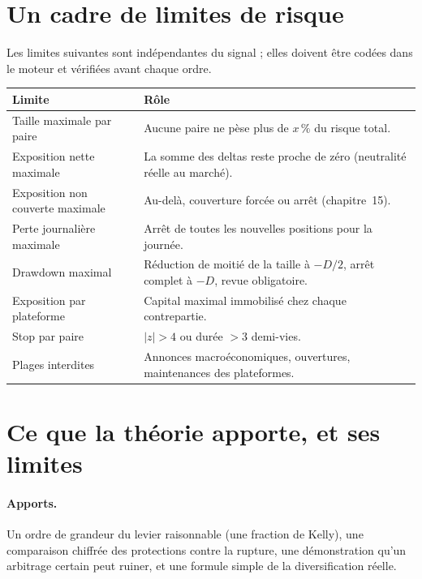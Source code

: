 \section{Un cadre de limites de risque}

Les limites suivantes sont indépendantes du signal ; elles doivent être codées dans le moteur et vérifiées avant chaque ordre.

\begin{center}\small
\begin{tabularx}{\textwidth}{>{\raggedright}p{4.2cm}>{\raggedright\arraybackslash}X}
\toprule
Limite & Rôle \\
\midrule
Taille maximale par paire & Aucune paire ne pèse plus de $x\,\%$ du risque total. \\
Exposition nette maximale & La somme des deltas reste proche de zéro (neutralité réelle au marché). \\
Exposition non couverte maximale & Au-delà, couverture forcée ou arrêt (chapitre~15). \\
Perte journalière maximale & Arrêt de toutes les nouvelles positions pour la journée. \\
Drawdown maximal & Réduction de moitié de la taille à $-D/2$, arrêt complet à $-D$, revue obligatoire. \\
Exposition par plateforme & Capital maximal immobilisé chez chaque contrepartie. \\
Stop par paire & $|z| > 4$ ou durée $> 3$ demi-vies. \\
Plages interdites & Annonces macroéconomiques, ouvertures, maintenances des plateformes. \\
\bottomrule
\end{tabularx}
\end{center}

\section{Ce que la théorie apporte, et ses limites}

\paragraph{Apports.} Un ordre de grandeur du levier raisonnable (une fraction de Kelly), une comparaison chiffrée des protections contre la rupture, une démonstration qu'un arbitrage certain peut ruiner, et une formule simple de la diversification réelle.

